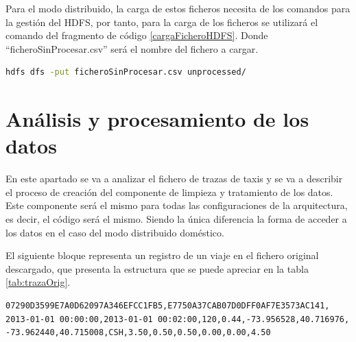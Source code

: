 Para el modo distribuido, la carga de estos ficheros necesita de los comandos para la gestión del \gls{HDFS}, por tanto, para la carga de los ficheros se utilizará el comando del fragmento de código \ref{cargaFicheroHDFS}. Donde ``ficheroSinProcesar.csv'' será el nombre del fichero a cargar.

\begin{lstlisting}[label=cargaFicheroHDFS,language=sh,frame=single,caption=Comando para añadir los ficheros sin procesar al sistema de replicación]
hdfs dfs -put ficheroSinProcesar.csv unprocessed/
\end{lstlisting}

\section{Análisis y procesamiento de los datos \label{anaProcData}}
En este apartado se va a analizar el fichero de trazas de taxis y se va a describir el proceso de creación del componente de limpieza y tratamiento de los datos. Este componente será el mismo para todas las configuraciones de la arquitectura, es decir, el código será el mismo. Siendo la única diferencia la forma de acceder a los datos en el caso del modo distribuido doméstico.

El siguiente bloque representa un registro de un viaje en el fichero original descargado, que presenta la estructura que se puede apreciar en la tabla \ref{tab:trazaOrig}. 


\begin{verbatim}
07290D3599E7A0D62097A346EFCC1FB5,E7750A37CAB07D0DFF0AF7E3573AC141,
2013-01-01 00:00:00,2013-01-01 00:02:00,120,0.44,-73.956528,40.716976,
-73.962440,40.715008,CSH,3.50,0.50,0.50,0.00,0.00,4.50
\end{verbatim}


